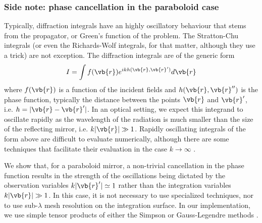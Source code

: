 \documentclass[11pt,SymmetricalJury]{inrsthesis/inrsthesis}
\begin{document}

\subsubsection{Side note: phase cancellation in the paraboloid case}

Typically, diffraction integrals have an highly oscillatory behaviour that
stems from the propagator, or Green's function of the problem. The Stratton-Chu
integrals (or even the Richards-Wolf integrals, for that matter, although they
use a trick) are not exception. The diffraction integrals are of the generic form
  \begin{equation}
    I = \int f(\vb{r})e^{ikh(\vb{r},\vb{r}')}d\vb{r}
  \end{equation}
where $f(\vb{r})$ is a function of the incident fields and $h(\vb{r},\vb{r}'')$
is the phase function, typically the distance between the points $\vb{r}$ and
$\vb{r}'$, i.e. $h=|\vb{r}-\vb{r}'|$. In an optical setting, we expect this integrand to oscillate rapidly
as the wavelength of the radiation is much smaller than the size of the reflecting
mirror, i.e. $k|\vb{r}|\gg1$. Rapidly oscillating integrals of the form above
are difficult to evaluate numerically, although there are some techniques
that facilitate their evaluation in the case $k\rightarrow\infty$ \cite{Iserles2004,Ganesh2007}.

We show that, for a paraboloid mirror, a non-trivial cancellation in the phase function
results in the strength of the oscillations being dictated by the observation
variables $k|\vb{r}'|\simeq1$ rather than the integration variables $k|\vb{r}|\gg1$.
In this case, it is not necessary to use specialized techniques, nor to use
sub-$\lambda$ mesh resolution on the integration surface. In our implementation,
we use simple tensor products of either the Simpson or Gauss-Legendre methods
\cite[\S4.6]{Press1986}.
\end{document}
